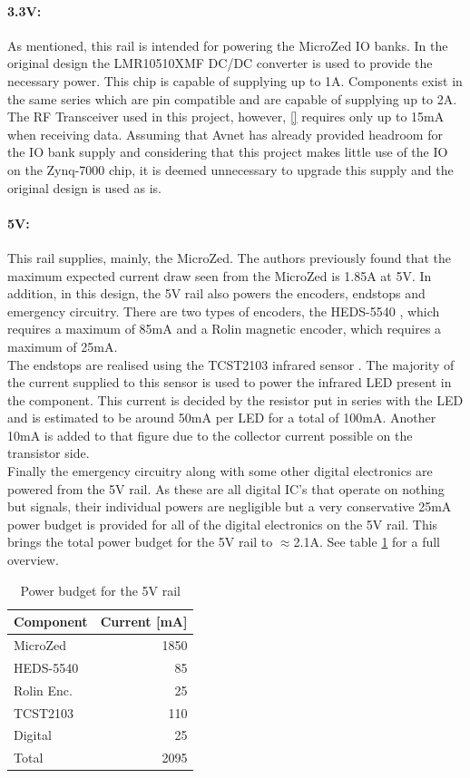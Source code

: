 \paragraph{3.3V:} %
\label{par:3_3v}
As mentioned, this rail is intended for powering the MicroZed IO banks.
In the original design the LMR10510XMF DC/DC converter is used to provide the necessary power.
This chip is capable of supplying up to 1A.
Components exist in the same series which are pin compatible and are capable of supplying up to 2A.
The RF Transceiver used in this project, however, \ref{} requires only up to 15mA when receiving data.
Assuming that Avnet has already provided headroom for the IO bank supply and considering that this project makes little use of the IO on the Zynq-7000 chip, it is deemed unnecessary to upgrade this supply and the original design is used as is.

\paragraph{5V:} %
\label{par:5v}
This rail supplies, mainly, the MicroZed.
The authors previously found \cite{isaswarm} that the maximum expected current draw seen from the MicroZed is 1.85A at 5V.
In addition, in this design, the 5V rail also powers the encoders, endstops and emergency circuitry.
There are two types of encoders, the HEDS-5540 \cite{heds5540}, which requires a maximum of 85mA and a Rolin magnetic encoder, which requires a maximum of 25mA.\\
The endstops are realised using the TCST2103 infrared sensor \cite{tcst2103}.
The majority of the current supplied to this sensor is used to power the infrared LED present in the component.
This current is decided by the resistor put in series with the LED and is estimated to be around 50mA per LED for a total of 100mA.
Another 10mA is added to that figure due to the collector current possible on the transistor side.\\
Finally the emergency circuitry along with some other digital electronics are powered from the 5V rail.
As these are all digital IC's that operate on nothing but signals, their individual powers are negligible but a very conservative 25mA power budget is provided for all of the digital electronics on the 5V rail. This brings the total power budget for the 5V rail to $\approx$2.1A.
See table \ref{tab:5vpowerbudget} for a full overview.

\begin{table}
	\centering
	\begin{tabular}{l|r}
		 Component & Current [mA]\\
		 \hline
		 MicroZed & 1850\\
		 HEDS-5540 & 85\\
		 Rolin Enc. & 25\\
		 TCST2103 & 110\\
		 Digital & 25\\
		 \hline
		 Total & 2095
	\end{tabular}
	\caption{Power budget for the 5V rail}
	\label{tab:5vpowerbudget}
\end{table}


